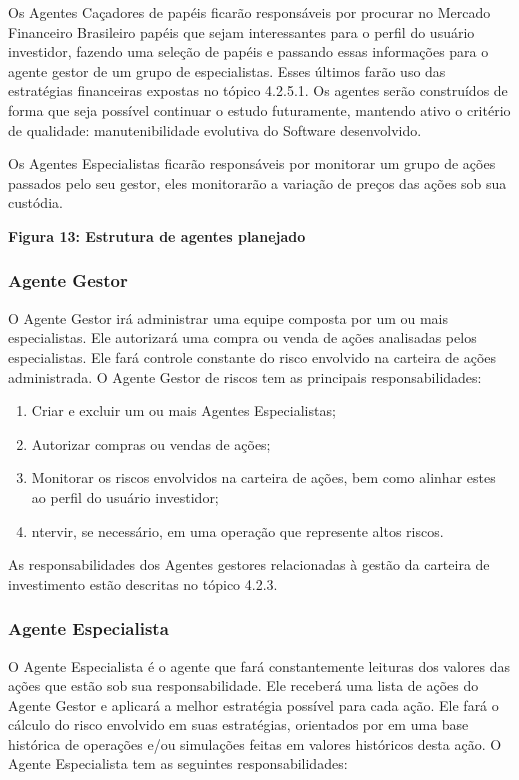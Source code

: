 Os Agentes Caçadores de papéis ficarão responsáveis por procurar no Mercado Financeiro Brasileiro papéis que sejam interessantes para o perfil do usuário investidor, fazendo uma seleção de papéis e passando essas informações para o agente gestor de um grupo de especialistas. Esses últimos farão uso das estratégias financeiras expostas no tópico 4.2.5.1. Os agentes serão construídos de forma que seja possível continuar o estudo futuramente, mantendo ativo o critério de qualidade: manutenibilidade evolutiva do Software desenvolvido.

Os Agentes Especialistas ficarão responsáveis por monitorar um grupo de ações passados pelo seu gestor, eles monitorarão a variação de preços das ações sob sua custódia.

\textbf{Figura 13: Estrutura de agentes planejado}

\subsubsection{Agente Gestor}
O Agente Gestor irá administrar uma equipe composta por um ou mais especialistas. Ele autorizará uma compra ou venda de ações analisadas pelos especialistas. Ele fará controle constante do risco envolvido na carteira de ações administrada. O Agente Gestor de riscos tem as principais responsabilidades:
\begin{enumerate}
\item Criar e excluir um ou mais Agentes Especialistas;
\item Autorizar compras ou vendas de ações;
\item Monitorar os riscos envolvidos na carteira de ações, bem como alinhar estes ao perfil do usuário investidor;
\item ntervir, se necessário, em uma operação que represente altos riscos.
\end{enumerate}

As responsabilidades dos Agentes gestores relacionadas à gestão da carteira de investimento estão descritas no tópico 4.2.3.

\subsubsection{Agente Especialista}

O Agente Especialista é o agente que fará constantemente leituras dos valores das ações que estão sob sua responsabilidade. Ele receberá uma lista de ações do Agente Gestor e aplicará a melhor estratégia possível para cada ação. Ele fará o cálculo do risco envolvido em suas estratégias, orientados por em uma base histórica de operações e/ou simulações feitas em valores históricos desta ação. O Agente Especialista tem as seguintes responsabilidades:

